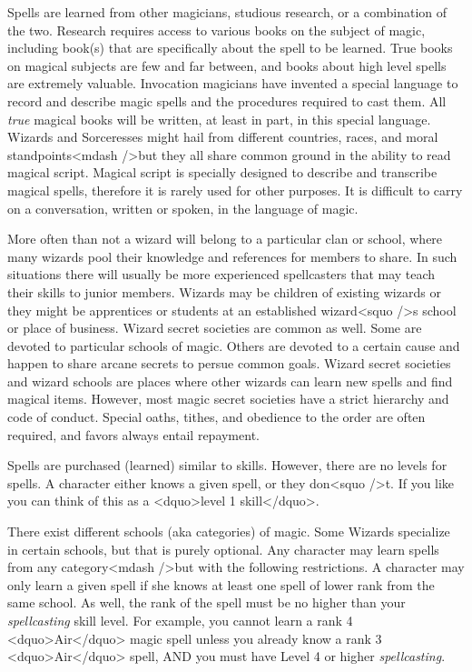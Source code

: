 Spells are learned from other magicians, studious research, or a
combination of the two.  Research requires access to various books on
the subject of magic, including book(s) that are specifically about
the spell to be learned.  True books on magical subjects are few and
far between, and books about high level spells are extremely valuable.
Invocation magicians have invented a special language to record and
describe magic spells and the procedures required to cast them.  All
\emph{true} magical books will be written, at least in part, in this
special language.  Wizards and Sorceresses might hail from different
countries, races, and moral standpoints<mdash />but they all share common
ground in the ability to read magical script.  Magical script is
specially designed to describe and transcribe magical spells,
therefore it is rarely used for other purposes.  It is difficult to
carry on a conversation, written or spoken, in the language of magic.

More often than not a wizard will belong to a particular clan or
school, where many wizards pool their knowledge and references for
members to share.  In such situations there will usually be more
experienced spellcasters that may teach their skills to junior
members.  Wizards may be children of existing wizards or they might be
apprentices or students at an established wizard<squo />s school or place of
business.  Wizard secret societies are common as well.  Some are
devoted to particular schools of magic.  Others are devoted to a
certain cause and happen to share arcane secrets to persue common
goals.  Wizard secret societies and wizard schools are places where
other wizards can learn new spells and find magical items.  However,
most magic secret societies have a strict hierarchy and code of
conduct.  Special oaths, tithes, and obedience to the order are often
required, and favors always entail repayment.

Spells are purchased (learned) similar to skills.  However, there are
no levels for spells.  A character either knows a given spell, or they
don<squo />t.  If you like you can think of this as a <dquo>level 1 skill</dquo>.

There exist different schools (aka categories) of magic.  Some Wizards
specialize in certain schools, but that is purely optional.  Any
character may learn spells from any category<mdash />but with the following
restrictions.  A character may only learn a given spell if she knows
at least one spell of lower rank from the same school.  As well, the
rank of the spell must be no higher than your \emph{spellcasting}
skill level.  For example, you cannot learn a rank 4 <dquo>Air</dquo> magic
spell unless you already know a rank 3 <dquo>Air</dquo> spell, AND you must
have Level 4 or higher \emph{spellcasting}.

